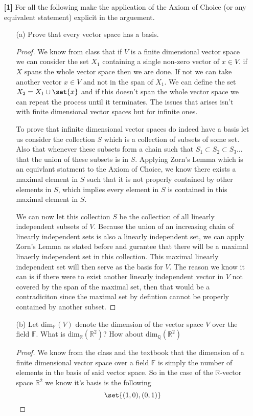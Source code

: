 \documentclass[12pt]{article}
\DeclarePairedDelimiter\set\{\}
\newcommand      {\Qm}         {{\mathbb Q}}
\newcommand      {\Rm}         {{\mathbb R}}
\newcommand      {\Fm}          {{\mathbb F}}
\begin{document}
\begin{itemize}
\begin{itemize}
\begin{proof}
            Thus we have it that the differntial map as defined in part b is neither injective nor surjective. 

        \end{proof}
        
        
    \end{itemize}    


    \item[\textbf{[1]}] For all the following make the application of the Axiom of Choice (or any equivalent statement) explicit in the arguement.
    \begin{itemize}
        \item[(a)] Prove that every vector space has a basis.
        \begin{proof}
            We know from class that if $V$ is a finite dimensional vector space we can consider the set $X_1$  containing a single non-zero vector of $x\in V$. if $X$ spans the whole vector space then we are done. If not we can take another vector $x\in V$ and not in the span of $X_1$. We can define the set $X_2 = X_1 \cup \set{x} $ and if this doesn't span the whole vector space we can repeat the process until it terminates. The issues that arises isn't with finite dimensional vector spaces but for infinite ones.

            To prove that infinite dimensional vector spaces do indeed have a basis let us consider the collection $S$ which is a collection of subsets of some set. Also that whenever these subsets form a chain such that $S_1 \subset S_2 \subset S_3 \dots$ that the union of these subsets is in $S$. Applying Zorn's Lemma which is an equivlant statment to the Axiom of Choice, we know there exists a maximal element in $S$ such that it is not properly contained by other elements in $S$, which implies every element in $S$ is contained in this maximal element in $S$. 

            We can now let this collection $S$ be the collection of all linearly independent subsets of $V$. Because the union of an increasing chain of linearly independent sets is also a linearly independent set, we can apply Zorn's Lemma as stated before and gurantee that there will be a maximal linaerly independent set in this collection. This maximal linearly independent set will then serve as the basis for $V$. The reason we know it can is if there were to exist another linearly independent vector in $V$ not covered by the span of the maximal set, then that would be a contradiciton since the maximal set by defintion cannot be properly contained by another subset.
        \end{proof}
        \item[(b)] Let dim$_\Fm (V)$ denote the dimension of the vector space $V$ over the field $\Fm$. What is  dim$_\Rm(\Rm^2)$? How about dim$_\Qm(\Rm^2)$
        \begin{proof}
            We know from the class and the textbook that the dimension of a finite dimensional vector space over a field $\Fm$ is simply the number of elements in the basis of said vector space. So in the case of the $\Rm$-vector space $\Rm^2$ we know it's basis is the following \[\set{(1,0),(0,1)}\]


\end{proof}
\end{itemize}
\end{itemize}
\end{document}
